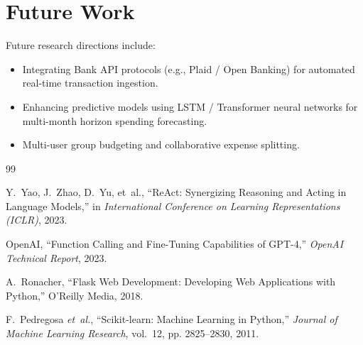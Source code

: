 \documentclass[12pt,a4paper,oneside]{report}
\begin{document}
\section{Future Work}
Future research directions include:
\begin{itemize}
    \item Integrating Bank API protocols (e.g., Plaid / Open Banking) for automated real-time transaction ingestion.
    \item Enhancing predictive models using LSTM / Transformer neural networks for multi-month horizon spending forecasting.
    \item Multi-user group budgeting and collaborative expense splitting.
\end{itemize}

\newpage
{}
\begin{thebibliography}{99}

Y.~Yao, J.~Zhao, D.~Yu, et~al., ``ReAct: Synergizing Reasoning and Acting in Language Models,'' in \emph{International Conference on Learning Representations (ICLR)}, 2023.

OpenAI, ``Function Calling and Fine-Tuning Capabilities of GPT-4,'' \emph{OpenAI Technical Report}, 2023.

A.~Ronacher, ``Flask Web Development: Developing Web Applications with Python,'' O'Reilly Media, 2018.

F.~Pedregosa \emph{et~al.}, ``Scikit-learn: Machine Learning in Python,'' \emph{Journal of Machine Learning Research}, vol.~12, pp. 2825--2830, 2011.

\end{thebibliography}
\end{document}
